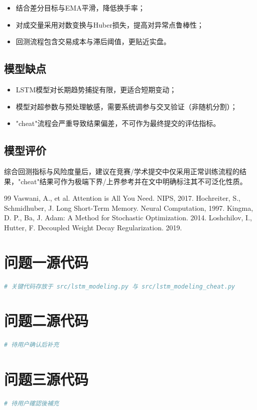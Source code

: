 \documentclass[withoutpreface,bwprint]{cumcmthesis}
\begin{document}
\begin{itemize}
    \item 结合差分目标与EMA平滑，降低换手率；
    \item 对成交量采用对数变换与Huber损失，提高对异常点鲁棒性；
    \item 回测流程包含交易成本与滞后阈值，更贴近实盘。
\end{itemize}

\subsection {模型缺点}
\begin{itemize}
    \item LSTM模型对长期趋势捕捉有限，更适合短期变动；
    \item 模型对超参数与预处理敏感，需要系统调参与交叉验证（非随机分割）；
    \item "cheat"流程会严重导致结果偏差，不可作为最终提交的评估指标。
\end{itemize}

\subsection{模型评价}

综合回测指标与风险度量后，建议在竞赛/学术提交中仅采用正常训练流程的结果，"cheat"结果可作为极端下界/上界参考并在文中明确标注其不可泛化性质。

\newpage
\begin{thebibliography}{99}
     Vaswani, A., et al. Attention is All You Need. NIPS, 2017.
     Hochreiter, S., Schmidhuber, J. Long Short-Term Memory. Neural Computation, 1997.
     Kingma, D. P., Ba, J. Adam: A Method for Stochastic Optimization. 2014.
     Loshchilov, I., Hutter, F. Decoupled Weight Decay Regularization. 2019.
\end{thebibliography}

\newpage
\begin{appendices}

\section{问题一源代码}
\begin{lstlisting}[language=python]
# 关键代码存放于 src/lstm_modeling.py 与 src/lstm_modeling_cheat.py
\end{lstlisting}

\section{问题二源代码}
\begin{lstlisting}[language=python]
# 待用户确认后补充
\end{lstlisting}

\section{问题三源代码}
\begin{lstlisting}[language=python]
# 待用户確認後補充
\end{lstlisting}

\end{appendices}
\end{document}
